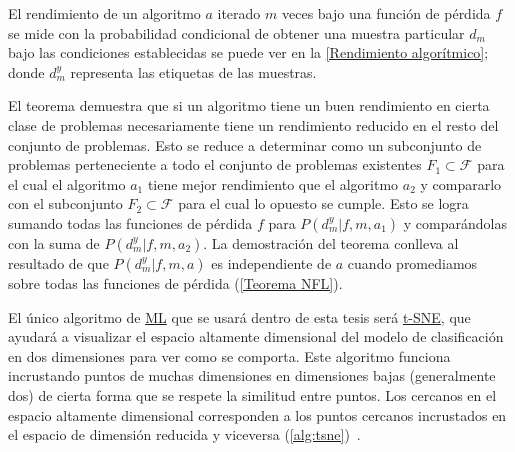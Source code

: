 El rendimiento de un algoritmo \(a\) iterado \( m\) veces bajo una función de
pérdida \(f\) se mide con la probabilidad condicional de obtener una muestra
particular \(d_{m}\) bajo las condiciones establecidas se puede ver en la
\autoref{Rendimiento algorítmico}; donde \(d^{y}_{m}\) representa las etiquetas
de las muestras. 

\begin{minipage}{\textwidth}
\end{minipage}

El teorema demuestra que si un algoritmo tiene un buen rendimiento en cierta
clase de problemas necesariamente tiene un rendimiento reducido en el resto
del conjunto de problemas. Esto se reduce a determinar como un subconjunto de
problemas perteneciente a todo el conjunto de problemas existentes \(F_{1}
\subset \mathcal{F}\) para el cual el algoritmo \(a_{1}\) tiene mejor rendimiento
que el algoritmo \(a_{2}\) y compararlo con el subconjunto \(F_{2} \subset
\mathcal{F}\) para el cual lo opuesto se cumple. Esto se logra sumando todas las
funciones de pérdida \(f\) para \(P(d^{y}_{m} | f, m ,a_{1})\) y comparándolas con
la suma de \(P(d^{y}_{m} | f, m ,a_{2})\). La demostración del teorema conlleva al
resultado de que \(P(d^{y}_{m} | f, m ,a)\) es independiente de \(a\) cuando
promediamos sobre todas las funciones de pérdida (\autoref{Teorema
NFL})\cite{Wolpert1996}.


\begin{minipage}{\textwidth}
    El único algoritmo de \hyperlink{abbr}{ML} que se usará dentro de esta tesis
será \hyperlink{abbr}{t-SNE}, que ayudará a visualizar el espacio altamente
dimensional del modelo de clasificación en dos dimensiones para ver como se
comporta. Este algoritmo funciona incrustando puntos de muchas dimensiones en
dimensiones bajas (generalmente dos) de cierta forma que se respete la similitud
entre puntos. Los cercanos en el espacio altamente dimensional corresponden a
los puntos cercanos incrustados en el espacio de dimensión reducida y viceversa
(\autoref{alg:tsne})~\cite{VanderMaaten2008}\cite{VanderMaaten2013}.

\end{minipage}

